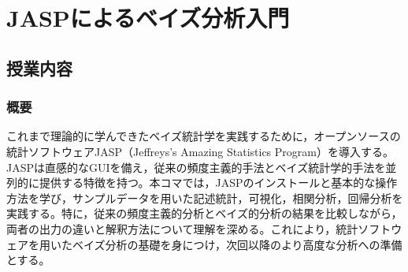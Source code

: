 \section{JASPによるベイズ分析入門}
\label{b27_jasp_intro}

\subsection{授業内容}

\subsubsection{概要}
これまで理論的に学んできたベイズ統計学を実践するために，オープンソースの統計ソフトウェアJASP（Jeffreys's Amazing Statistics Program）を導入する。JASPは直感的なGUIを備え，従来の頻度主義的手法とベイズ統計学的手法を並列的に提供する特徴を持つ。本コマでは，JASPのインストールと基本的な操作方法を学び，サンプルデータを用いた記述統計，可視化，相関分析，回帰分析を実践する。特に，従来の頻度主義的分析とベイズ的分析の結果を比較しながら，両者の出力の違いと解釈方法について理解を深める。これにより，統計ソフトウェアを用いたベイズ分析の基礎を身につけ，次回以降のより高度な分析への準備とする。

